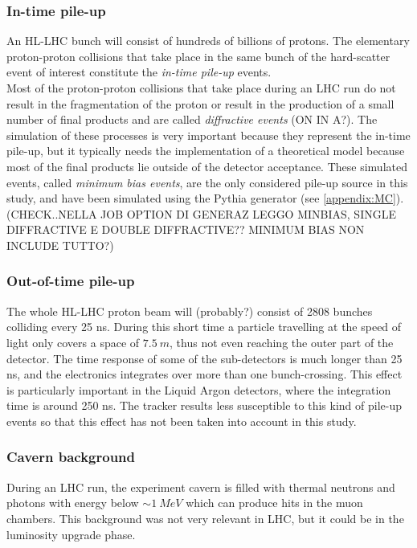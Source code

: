 \documentclass[a4paper,twoside,12pt]{article}
\begin{document}
\subsubsection*{In-time pile-up}
An HL-LHC bunch will consist of hundreds of billions of protons. The elementary
proton-proton collisions that take place in the same bunch of the hard-scatter event of
interest constitute the \textit{in-time pile-up} events.\\

Most of the proton-proton collisions that take place during an LHC run do not result in the 
fragmentation of the proton or result in the production of a small number of final products and are called \textit{diffractive events} (ON IN A?). The simulation of these
processes is very important because they represent the in-time pile-up, but it typically needs the implementation of a theoretical model because most of the final products lie outside of the detector acceptance. These simulated events, called \textit{minimum bias events}, are the only considered pile-up source in this study, and have been simulated using the Pythia generator (see \ref{appendix:MC}). (CHECK..NELLA JOB OPTION DI GENERAZ
LEGGO MINBIAS, SINGLE DIFFRACTIVE E DOUBLE DIFFRACTIVE?? MINIMUM BIAS NON INCLUDE TUTTO?)\\

\subsubsection*{Out-of-time pile-up}
The whole HL-LHC proton beam will (probably?) consist of 2808 bunches colliding every 25 ns.
During this short time a particle travelling at the speed of light only covers a space of $7.5\ m$, thus
not even reaching the outer part of the detector. The time response of some of the 
sub-detectors is much longer than 25 ns, and the electronics integrates over more than one
bunch-crossing. This effect is particularly important in the Liquid Argon detectors, where
the integration time is around 250 ns\cite{ATLAS_pileup}. The tracker results less susceptible to this kind of 
pile-up events so that this effect has not been taken into account in this study.

\subsubsection*{Cavern background}
During an LHC run, the experiment cavern is filled with thermal neutrons and photons with 
energy below $\sim 1\ MeV$ which can produce hits in the muon chambers. This background
was not very relevant in LHC, but it could be in the luminosity upgrade phase\cite{ATLAS_pileup}.
\end{document}

